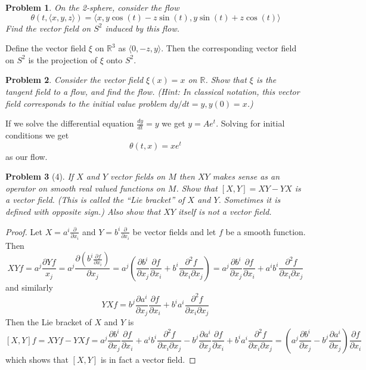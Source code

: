 \documentclass[10pt]{article}
\newcommand{\sk}{\vskip 10mm}
\newcommand{\bb}[1]{\mathbb{#1}}
\theoremstyle{plain}
\newtheorem{problem}{Problem}
\theoremstyle{remark}
\begin{document}
\begin{problem}
  On the 2-sphere, consider the flow
  \[
    \theta(t,\langle x,y,z\rangle)
    =\langle x,y\cos(t)-z\sin(t),y\sin(t)+z\cos(t)\rangle
  \]
  Find the vector field on $S^2$ induced by this flow.
\end{problem}

Define the vector field $\xi$ on $\bb{R}^3$ as $\langle 0,-z,y\rangle$. Then
the corresponding vector field on $S^2$ is the projection of $\xi$
onto $S^2$.

\sk

\begin{problem}
  Consider the vector field $\xi(x)=x$ on $\bb{R}$. Show that $\xi$ is the
  tangent field to a flow, and find the flow. (Hint: In classical notation,
  this vector field corresponds to the initial value problem $dy/dt=y,y(0)=x$.)
\end{problem}

If we solve the differential equation $\frac{dy}{dt}=y$ we get
$y=Ae^t$. Solving for initial conditions we get
\[
  \theta(t,x)=xe^t
\]
as our flow.

\sk

\begin{problem}[4]
  If $X$ and $Y$ vector fields on $M$ then $XY$ makes sense as an operator
  on smooth real valued functions on $M$. Show that $[X,Y]=XY-YX$ is a vector
  field. (This is called the ``Lie bracket'' of $X$ and $Y$. Sometimes it is
  defined with opposite sign.) Also show that $XY$ itself is not a vector
  field.
\end{problem}

\begin{proof}
  Let $X=a^i\frac{\partial}{\partial x_i}$ and $Y=b^i\frac{\partial}{\partial x_i}$ be vector fields and let
  $f$ be a smooth function. Then
  \[
    XYf = a^j\frac{\partial Yf}{x_j}=a^j\frac{\partial(b^i\frac{\partial f}{\partial x_i})}{\partial x_j}=a^j(\frac{\partial b^i}{\partial x_j}\frac{\partial f}{\partial x_i}+b^i\frac{\partial^2 f}{\partial x_i\partial x_j}) = a^j\frac{\partial b^i}{\partial x_j}\frac{\partial f}{\partial x_i}+a^ib^i\frac{\partial^2 f}{\partial x_i\partial x_j}
  \]
  and similarly
  \[
    YXf = b^j\frac{\partial a^i}{\partial x_j}\frac{\partial f}{\partial x_i}+b^ia^i\frac{\partial^2 f}{\partial x_i\partial x_j}
  \]
  Then the Lie bracket of $X$ and $Y$ is
  \[
    [X,Y]f=XYf-YXf=a^j\frac{\partial b^i}{\partial x_j}\frac{\partial f}{\partial x_i}+a^ib^i\frac{\partial^2 f}{\partial x_i\partial x_j}-b^j\frac{\partial a^i}{\partial x_j}\frac{\partial f}{\partial x_i}+b^ia^i\frac{\partial^2 f}{\partial x_i\partial x_j} = (a^j\frac{\partial b^i}{\partial x_j}-b^j\frac{\partial a^i}{\partial x_j})\frac{\partial f}{\partial x_i}
  \]
  which shows that $[X,Y]$ is in fact a vector field.
\end{proof}
\end{document}
